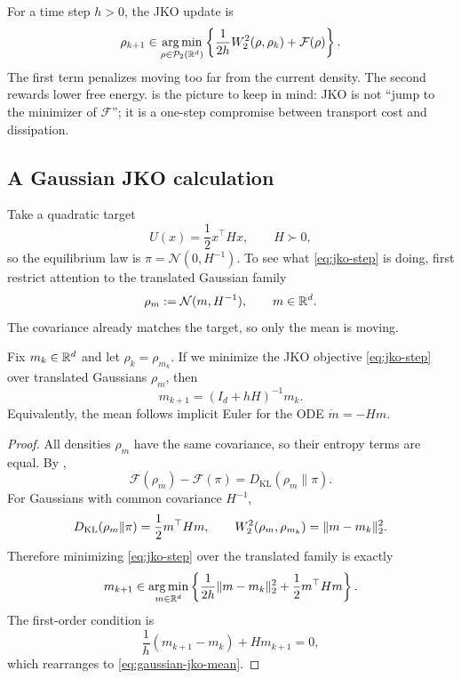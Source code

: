 \documentclass[11pt]{article}
\begin{document}
For a time step $h>0$, the JKO update is
\begin{equation}
  \rho_{k+1}
  \in
  \operatorname*{arg\,min}_{\rho\in\mathcal{P}_2(\mathbb{R}^d)}
  \left\{
    \frac{1}{2h}W_2^2(\rho,\rho_k)+\mathcal{F}(\rho)
  \right\}.
  \label{eq:jko-step}
\end{equation}
The first term penalizes moving too far from the current density.
The second rewards lower free energy.
 is the picture to keep in mind: JKO is not ``jump to the minimizer of $\mathcal{F}$''; it is a one-step compromise between transport cost and dissipation.

\subsection{A Gaussian JKO calculation}
\label{subsec:jko-gaussian}

Take a quadratic target
\[
U(x)=\frac12 x^\top Hx,
\qquad
H\succ 0,
\]
so the equilibrium law is $\pi=\mathcal{N}(0,H^{-1})$.
To see what \eqref{eq:jko-step} is doing, first restrict attention to the translated Gaussian family
\[
\rho_m:=\mathcal{N}(m,H^{-1}),
\qquad
m\in\mathbb{R}^d.
\]
The covariance already matches the target, so only the mean is moving.

\begin{proposition}
\label{prop:gaussian-jko-mean}
Fix $m_k\in\mathbb{R}^d$ and let $\rho_k=\rho_{m_k}$.
If we minimize the JKO objective \eqref{eq:jko-step} over translated Gaussians $\rho_m$, then
\begin{equation}
  m_{k+1}
  =
  (I_d+hH)^{-1}m_k.
  \label{eq:gaussian-jko-mean}
\end{equation}
Equivalently, the mean follows implicit Euler for the ODE $\dot m=-Hm$.
\end{proposition}

\begin{proof}
All densities $\rho_m$ have the same covariance, so their entropy terms are equal.
By ,
\[
\mathcal{F}(\rho_m)-\mathcal{F}(\pi)=D_{\mathrm{KL}}(\rho_m\|\pi).
\]
For Gaussians with common covariance $H^{-1}$,
\[
D_{\mathrm{KL}}(\rho_m\|\pi)=\frac12 m^\top Hm,
\qquad
W_2^2(\rho_m,\rho_{m_k})=\lVert m-m_k\rVert_2^2.
\]
Therefore minimizing \eqref{eq:jko-step} over the translated family is exactly
\[
m_{k+1}
\in
\operatorname*{arg\,min}_{m\in\mathbb{R}^d}
\left\{
\frac{1}{2h}\lVert m-m_k\rVert_2^2+\frac12 m^\top Hm
\right\}.
\]
The first-order condition is
\[
\frac{1}{h}(m_{k+1}-m_k)+Hm_{k+1}=0,
\]
which rearranges to \eqref{eq:gaussian-jko-mean}.%
\end{proof}
\end{document}
